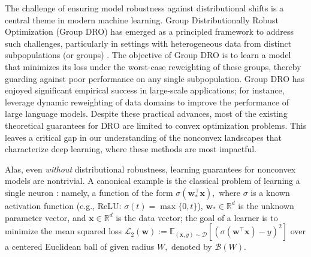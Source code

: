 \documentclass[11pt]{article}
\numberwithin{thm}{section}
\theoremstyle{plain}
\theoremstyle{definition}
\theoremstyle{remark} \newtheorem{remark}[thm]{Remark}
\def\vw{{\bm{w}}}
\def\vx{{\bm{x}}}
\def\cB{{\mathcal{B}}}
\def\cD{{\mathcal{D}}}
\def\cL{{\mathcal{L}}}
\newcommand{\E}{\mathbb{E}}
\newcommand{\R}{\mathbb{R}}
\begin{document}
The challenge of ensuring model robustness against distributional shifts 
is a central theme in modern machine learning. 
Group Distributionally Robust Optimization (Group DRO) 
has emerged as a principled framework to address such challenges, 
particularly in settings with heterogeneous data from distinct subpopulations (or groups) 
\citep{hashimoto2018fairness,oren2019distributionally,sagawa2020groupDRO}. 
The objective of Group DRO is to learn a model that minimizes 
its loss under the worst-case reweighting of these groups, 
thereby guarding against poor performance on any single subpopulation. 
Group DRO has enjoyed significant empirical success in large-scale applications; 
for instance, \citep{xie2023doremi, xia2024shearedllamaacceleratinglanguage} leverage dynamic reweighting 
of data domains to improve the performance 
of large language models. 
Despite these practical advances, 
most of the existing theoretical guarantees for DRO are limited to convex optimization problems. 
This leaves a critical gap in our understanding 
of the nonconvex landscapes that characterize deep learning, 
where these methods are most impactful.

Alas, even \emph{without} distributional robustness, 
learning guarantees for nonconvex models are nontrivial.
A canonical example is the classical problem of learning a single neuron \citep{rosenblatt1958perceptron, nelder1972generalized}: namely, a function of the form $\sigma(\vw_*^\top \vx),$ where $\sigma$ is a known activation function (e.g., ReLU: $\sigma(t) = \max\{0, t\}$), $\vw_* \in \R^d$ is the unknown parameter vector, and $\vx \in \R^d$ is the data vector; the goal of a learner is to minimize the mean squared loss $\cL_2(\vw) := \E_{(\vx, y)\sim \cD}[(\sigma(\vw^\top \vx) - y)^2]$ over a centered Euclidean ball of given radius $W,$ denoted by $\cB(W)$.   
\end{document}
